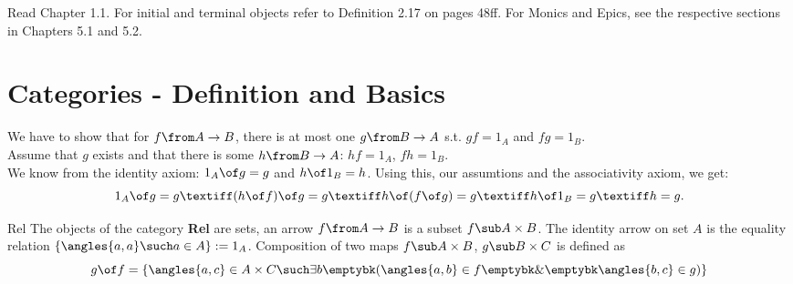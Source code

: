 \def\pathToRoot{../../}




\begin{hint}
  Read Chapter 1.1. For initial and terminal objects refer to Definition 2.17 on pages 48ff. For Monics and Epics, see the respective sections in Chapters 5.1 and 5.2.
\end{hint}

%

\section{Categories - Definition and Basics}

\begin {exercise}
We have to show that for $f \from A \to B$, there is at most one $g \from B \to A$ s.t. $gf = 1_A$ and $fg = 1_B$. 
\\Assume that $g$ exists and that there is some $h \from B \to A$: $hf = 1_A$, $fh = 1_B$. 
\\We know from the identity axiom: $1_A \of g = g$ and $h \of 1_B = h$. Using this, our assumtions and the associativity axiom, we get:
 \[  1_A \of g = g \textiff (h \of f) \of g = g \textiff h \of (f \of g) = g \textiff h \of 1_B = g \textiff h=g. \]
\end{exercise}

\begin {definition}{Rel}
The objects of the category \textbf{Rel} are sets, an arrow $f \from A \to B$ is a subset $f \sub A \times B$. 
The identity arrow on set $A$ is the equality relation $\{\angles{a,a} \such a \in A\} := 1_A$. 
Composition of two maps $f \sub A \times B$, $g \sub B \times C$ is defined as 
\[ g \of f = \{ \angles{a, c} \in A \times C \such \exists b \emptybk (\angles {a, b} \in f \emptybk \& \emptybk \angles{b, c} \in g)\} \]
\end{definition}

